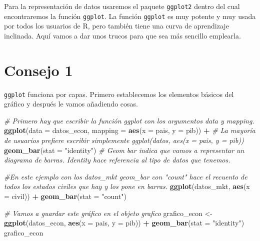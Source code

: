 \documentclass[
]{book}
\newenvironment{Shaded}{\begin{snugshade}}{\end{snugshade}}
\newcommand{\AttributeTok}[1]{\textcolor[rgb]{0.13,0.29,0.53}{#1}}
\newcommand{\CommentTok}[1]{\textcolor[rgb]{0.56,0.35,0.01}{\textit{#1}}}
\newcommand{\FunctionTok}[1]{\textcolor[rgb]{0.13,0.29,0.53}{\textbf{#1}}}
\newcommand{\NormalTok}[1]{#1}
\newcommand{\OtherTok}[1]{\textcolor[rgb]{0.56,0.35,0.01}{#1}}
\newcommand{\SpecialCharTok}[1]{\textcolor[rgb]{0.81,0.36,0.00}{\textbf{#1}}}
\newcommand{\StringTok}[1]{\textcolor[rgb]{0.31,0.60,0.02}{#1}}
\begin{document}
Para la representación de datos usaremos el paquete \texttt{ggplot2} dentro del cual encontraremos la función \texttt{ggplot}. La función \texttt{ggplot} es muy potente y muy usada por todos los usuarios de R, pero también tiene una curva de aprendizaje inclinada. Aquí vamos a dar unos trucos para que sea más sencillo emplearla.

\section{Consejo 1}\label{consejo-1}

\texttt{ggplot} funciona por capas. Primero establecemos los elementos básicos del gráfico y después le vamos añadiendo cosas.

\begin{Shaded}
\begin{Highlighting}[]
\CommentTok{\# Primero hay que escribir la función ggplot con los argumentos \textquotesingle{}data\textquotesingle{} y \textquotesingle{}mapping\textquotesingle{}.}
\FunctionTok{ggplot}\NormalTok{(}\AttributeTok{data =}\NormalTok{ datos\_econ, }\AttributeTok{mapping =} \FunctionTok{aes}\NormalTok{(}\AttributeTok{x =}\NormalTok{ pais, }\AttributeTok{y =}\NormalTok{ pib)) }\SpecialCharTok{+}
\CommentTok{\# La mayoría de usuarios prefiere escribir simplemente ggplot(datos, aes(x = pais, y = pib))}
  \FunctionTok{geom\_bar}\NormalTok{(}\AttributeTok{stat =} \StringTok{"identity"}\NormalTok{)}
\CommentTok{\# Geom bar indica que vamos a representar un diagrama de barras. Identity hace referencia al tipo de datos que tenemos.}

\CommentTok{\#En este ejemplo con los datos\_mkt geom\_bar con "count" hace el recuento de todos los estados civiles que hay y los pone en barras. }
\FunctionTok{ggplot}\NormalTok{(datos\_mkt, }\FunctionTok{aes}\NormalTok{(}\AttributeTok{x =}\NormalTok{ civil)) }\SpecialCharTok{+} \FunctionTok{geom\_bar}\NormalTok{(}\AttributeTok{stat =} \StringTok{"count"}\NormalTok{)}
\end{Highlighting}
\end{Shaded}

\begin{Shaded}
\begin{Highlighting}[]
\CommentTok{\# Vamos a guardar este gráfico en el objeto \textquotesingle{}grafico\textquotesingle{}}
\NormalTok{grafico\_econ }\OtherTok{\textless{}{-}} \FunctionTok{ggplot}\NormalTok{(datos\_econ, }\FunctionTok{aes}\NormalTok{(}\AttributeTok{x =}\NormalTok{ pais, }\AttributeTok{y =}\NormalTok{ pib)) }\SpecialCharTok{+} \FunctionTok{geom\_bar}\NormalTok{(}\AttributeTok{stat =} \StringTok{"identity"}\NormalTok{)}
\NormalTok{grafico\_econ}
\end{Highlighting}
\end{Shaded}
\end{document}
